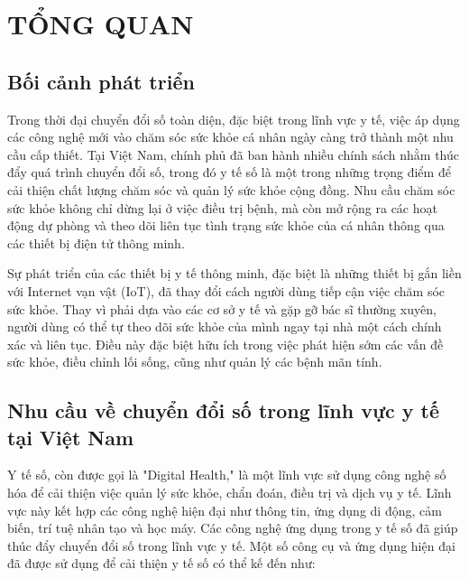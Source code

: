 \section{TỔNG QUAN}
\subsection{Bối cảnh phát triển}

Trong thời đại chuyển đổi số toàn diện, đặc biệt trong lĩnh vực y tế, việc áp dụng các công nghệ mới vào chăm sóc sức khỏe cá nhân ngày càng trở thành một nhu cầu cấp thiết. Tại Việt Nam, chính phủ đã ban hành nhiều chính sách nhằm thúc đẩy quá trình chuyển đổi số, trong đó y tế số là một trong những trọng điểm để cải thiện chất lượng chăm sóc và quản lý sức khỏe cộng đồng. Nhu cầu chăm sóc sức khỏe không chỉ dừng lại ở việc điều trị bệnh, mà còn mở rộng ra các hoạt động dự phòng và theo dõi liên tục tình trạng sức khỏe của cá nhân thông qua các thiết bị điện tử thông minh. 

Sự phát triển của các thiết bị y tế thông minh, đặc biệt là những thiết bị gắn liền với Internet vạn vật (IoT), đã thay đổi cách người dùng tiếp cận việc chăm sóc sức khỏe. Thay vì phải dựa vào các cơ sở y tế và gặp gỡ bác sĩ thường xuyên, người dùng có thể tự theo dõi sức khỏe của mình ngay tại nhà một cách chính xác và liên tục. Điều này đặc biệt hữu ích trong việc phát hiện sớm các vấn đề sức khỏe, điều chỉnh lối sống, cũng như quản lý các bệnh mãn tính.

\subsection{Nhu cầu về chuyển đổi số trong lĩnh vực y tế tại Việt Nam \cite{cds1} \cite{cds2} \cite{cds3}}
Y tế số, còn được gọi là "Digital Health," là một lĩnh vực sử dụng công nghệ số hóa để cải thiện việc quản lý sức khỏe, chẩn đoán, điều trị và dịch vụ y tế. Lĩnh vực này kết hợp các công nghệ hiện đại như thông tin, ứng dụng di động, cảm biến, trí tuệ nhân tạo và học máy. Các công nghệ ứng dụng trong y tế số đã giúp thúc đẩy chuyển đổi số trong lĩnh vực y tế. Một số công cụ và ứng dụng hiện đại đã được sử dụng để cải thiện y tế số có thể kế đến như:

